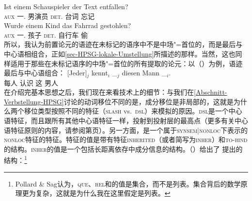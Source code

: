 \ex 
\gll Ist einem Schauspieler der Text entfallen?\\
      \textsc{aux}  一.\dat{} 男演员     \textsc{det}.\nom{} 台词 忘记\\
\ex
\gll Wurde einem Kind das Fahrrad gestohlen?\\
     \textsc{aux} 一.\dat{} 孩子 \textsc{det}.\nom{} 自行车 偷\\
\zl
所以，我认为前置论元的语迹在未标记的语序中不是中场"=首位的，而是最后与中心语相组合，正如\ref{sec-HPSG-lokale-Umstellung}所描述的那样。当然，这也同样适用于那些在未标记语序的中场"=首位的所有提取的论元：以（）为例，语迹最后与中心语组合：
\ea
\label{Beispiel-jeder-kennt-diesen-Mann-HPSG}
\gll {}[Jeder]$_j$ kennt$_i$ \_$_j$ diesen Mann \_$_i$.\\
	 {}\spacebr{}每人 认识 {} 这 男人\\
\z
在介绍完基本思想之后，我们现在来看技术上的细节：与我们在\ref{Abschnitt-Verbstellung-HPSG}讨论的动词移位不同的是，成分移位是非局部的，这就是为什么两个移位类型按照不同的特征（\textsc{slash} vs.\ \textsc{dsl}）来模拟的原因。\textsc{dsl}是一个中心语特征，而且跟所有其他中心语特征一样，投射到投射层的最高点（更多有关中心语特征原则的内容，请参阅第\pageref{prinzip-hfp}页）。另一方面，\slaschc 是一个属于\textsc{synsem|nonloc}下表示的\textsc{nonloc}特征的特征。\nonlocc 特征的值是带有特征\textsc{inherited}（或者简写为\textsc{inher}）和\textsc{to-bind}的结构。\textsc{inher}的值是一个包括长距离依存中成分信息的结构。（）给出了 \citet[]{ps2}提出的结构：\footnote{%
Pollard \& Sag认为，\textsc{que}、\textsc{rel}和\slaschc 的值是集合，而不是列表。集合背后的数学原理更为复杂，这就是为什么我在这里假定是列表。
}
